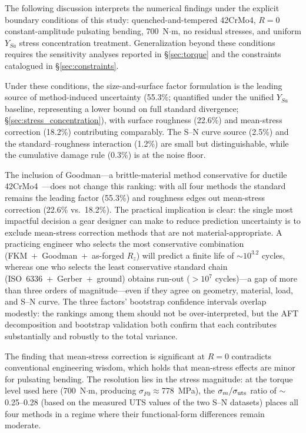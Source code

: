 \documentclass[twocolumn,12pt,a4paper]{article}
\begin{document}
The following discussion interprets the numerical findings under the
explicit boundary conditions of this study: quenched-and-tempered
42CrMo4, $R=0$ constant-amplitude pulsating bending, 700~N$\cdot$m,
no residual stresses, and uniform $Y_{Sa}$ stress concentration
treatment. Generalization beyond these conditions requires the
sensitivity analyses reported in \S\ref{sec:torque} and the
constraints catalogued in \S\ref{sec:constraints}.

Under these conditions, the size-and-surface factor formulation is
the leading source of method-induced uncertainty (55.3\%; quantified
under the unified $Y_{Sa}$ baseline, representing a lower bound on
full standard divergence; \S\ref{sec:stress_concentration}), with
surface roughness (22.6\%) and mean-stress correction (18.2\%)
contributing comparably. The S--N curve source (2.5\%) and the
standard--roughness interaction (1.2\%) are small but distinguishable,
while the cumulative damage rule (0.3\%) is at the noise floor.

The inclusion of Goodman---a brittle-material method conservative for
ductile 42CrMo4~\cite{stephens2001}---does not change this ranking:
with all four methods the standard remains the leading factor (55.3\%)
and roughness edges out mean-stress correction (22.6\% vs.\ 18.2\%).
The practical
implication is clear: the single most impactful decision a gear
designer can make
to reduce prediction uncertainty is to exclude mean-stress correction
methods that are not material-appropriate. A practicing engineer who selects the most conservative
combination
(FKM~+~Goodman~+~as-forged $R_z$) will predict a finite life of
$\sim$$10^{3.2}$ cycles, whereas one who selects the least
conservative standard chain (ISO~6336~+~Gerber~+~ground) obtains
run-out ($>10^7$ cycles)---a gap of more than three orders of
magnitude---even if they agree on geometry, material,
load, and S--N curve. The three factors' bootstrap confidence intervals
overlap modestly: the rankings among them should not be over-interpreted,
but the AFT decomposition and bootstrap validation both confirm that each
contributes substantially and robustly to the total variance.

The finding that mean-stress correction is significant at $R=0$
contradicts conventional engineering wisdom, which holds that
mean-stress effects are minor for pulsating bending. The resolution lies
in the stress magnitude: at the torque level used here (700~N$\cdot$m,
producing $\sigma_{F0} \approx 778$~MPa), the $\sigma_m/\sigma_{\rm uts}$
ratio of $\sim$0.25--0.28 (based on the measured UTS values of the two
S--N datasets) places all four methods in a regime where their
functional-form differences remain moderate.
\end{document}
